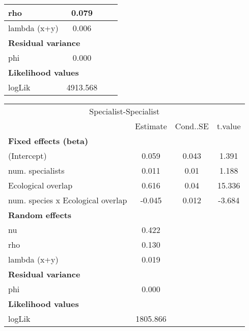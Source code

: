 \begin{table}
\begin{table}
\begin{tabular}[t]{l|c|c|c}
\hline
\hspace{1em}rho & 0.079 &  & \\
\hline
\hspace{1em}lambda (x+y) & 0.006 &  & \\
\hline
\multicolumn{4}{l}{\textbf{Residual variance}}\\
\hline
\hspace{1em}phi & 0.000 &  & \\
\hline
\multicolumn{4}{l}{\textbf{Likelihood values}}\\
\hline
\hspace{1em}logLik & 4913.568 &  & \\
\hline
\end{tabular}
\end{table}\begin{table}
\centering\centering
\begin{tabular}[t]{l|c|c|c}
\hline
\multicolumn{4}{c}{Specialist-Specialist} \\
\cline{1-4}
  & Estimate & Cond..SE & t.value\\
\hline
\multicolumn{4}{l}{\textbf{Fixed effects (beta)}}\\
\hline
\hspace{1em}(Intercept) & 0.059 & 0.043 & 1.391\\
\hline
\hspace{1em}num. specialists & 0.011 & 0.01 & 1.188\\
\hline
\hspace{1em}Ecological overlap & 0.616 & 0.04 & 15.336\\
\hline
\hspace{1em}num. species x Ecological overlap & -0.045 & 0.012 & -3.684\\
\hline
\multicolumn{4}{l}{\textbf{Random effects}}\\
\hline
\hspace{1em}nu & 0.422 &  & \\
\hline
\hspace{1em}rho & 0.130 &  & \\
\hline
\hspace{1em}lambda (x+y) & 0.019 &  & \\
\hline
\multicolumn{4}{l}{\textbf{Residual variance}}\\
\hline
\hspace{1em}phi & 0.000 &  & \\
\hline
\multicolumn{4}{l}{\textbf{Likelihood values}}\\
\hline
\hspace{1em}logLik & 1805.866 &  & \\
\hline
\end{tabular}
\end{table}
\end{table}
